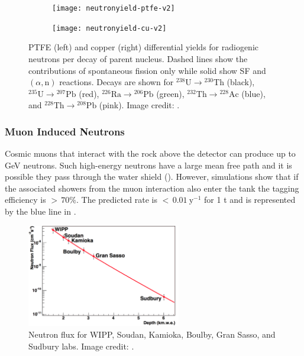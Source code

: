 \begin{figure}
    \centering
    \begin{subfigure}[t]{0.5\textwidth}
        \centering
        \texttt{[image: neutronyield-ptfe-v2]}
    \end{subfigure}%
    \begin{subfigure}[t]{0.5\textwidth}
        \centering
        \texttt{[image: neutronyield-cu-v2]}
    \end{subfigure}
    \caption[PTFE and copper differential yields for radiogenic neutrons per decay of parent nucleus.  Contributions from spontaneous fission
    only and SF with $(\alpha, \mathrm{n})$ reactions are shown.]{PTFE (left) and copper (right)
    differential yields for radiogenic neutrons per decay of parent nucleus.  Dashed lines show
    the contributions of spontaneous fission only while solid show SF and $(\alpha, \mathrm{n})$ reactions.  Decays are shown
    for $\mathrm{^{238}U} \rightarrow \mathrm{^{230}Th}$ (black), $\mathrm{^{235}U} \rightarrow \mathrm{^{207}Pb}$ (red),
    $\mathrm{^{226}Ra} \rightarrow \mathrm{^{206}Pb}$ (green), $\mathrm{^{232}Th} \rightarrow \mathrm{^{228}Ac}$ (blue), and
    $\mathrm{^{228}Th} \rightarrow \mathrm{^{208}Pb}$ (pink).  Image credit: .}
	\label{fig:backgrounds_nuclear_radiogenic_rates}
\end{figure}



\subsubsection{Muon Induced Neutrons}
\label{subsubsec:backgrounds_nuclear_muon_induced}
Cosmic muons that interact with the rock above the detector can produce up to GeV neutrons.  Such high-energy neutrons have a large mean
free path and it is possible they pass through the water shield ().  However, simulations show that
if the associated showers from the muon interaction also enter the tank the tagging efficiency is ${>}\, 70\%$.  The predicted rate is
${<}\, 0.01\ \mathrm{y^{-1}}$ for 1 t and is represented by the blue line in .

\begin{figure}
\centering
\includegraphics[width=0.6\textwidth]{MuonFluxOverDepth}
\caption{Neutron flux for WIPP, Soudan, Kamioka, Boulby, Gran Sasso, and Sudbury labs.  Image credit: .}
\label{fig:backgrounds_nuclear_muon_induced_flux}
\end{figure}

